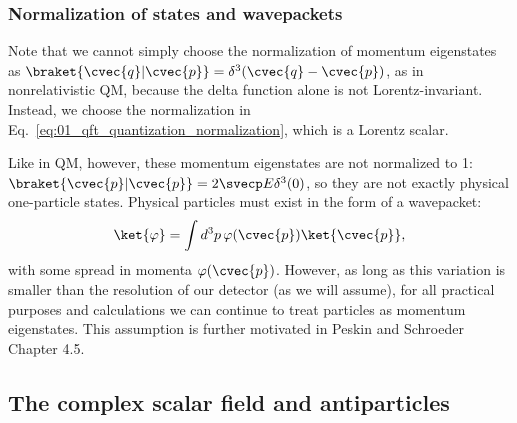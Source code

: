
\subsubsection{Normalization of states and wavepackets}

Note that we cannot simply choose the normalization of momentum eigenstates as $\braket{\cvec{q}|\cvec{p}} = \delta^3(\cvec{q} - \cvec{p})$, as in nonrelativistic QM, because the delta function alone is not Lorentz-invariant.
Instead, we choose the normalization in Eq.~\ref{eq:01_qft_quantization_normalization}, which is a Lorentz scalar.

Like in QM, however, these momentum eigenstates are not normalized to 1: $\braket{\cvec{p}|\cvec{p}} = 2\svecp E\delta^3(0)$, so they are not exactly physical one-particle states.
Physical particles must exist in the form of a wavepacket:
\begin{equation}
	\label{eq:01_qft_quantization_wavepacket}
	\ket{\varphi} = \int d^3p\, \varphi(\cvec{p})\ket{\cvec{p}},
\end{equation}
with some spread in momenta $\varphi(\cvec{p})$.
However, as long as this variation is smaller than the resolution of our detector (as we will assume), for all practical purposes and calculations we can continue to treat particles as momentum eigenstates.
This assumption is further motivated in Peskin and Schroeder~\cite{Peskin:1995ev} Chapter 4.5.

\subsection{The complex scalar field and antiparticles}
\label{sec:01_qft_quantization_complex}

